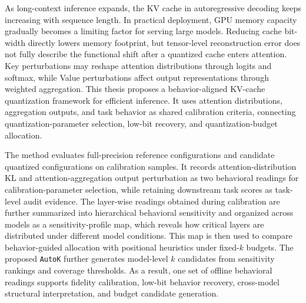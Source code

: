 
\begin{abstracten}

As long-context inference expands, the KV cache in autoregressive decoding keeps increasing with sequence length. In practical deployment, GPU memory capacity gradually becomes a limiting factor for serving large models. Reducing cache bit-width directly lowers memory footprint, but tensor-level reconstruction error does not fully describe the functional shift after a quantized cache enters attention. Key perturbations may reshape attention distributions through logits and softmax, while Value perturbations affect output representations through weighted aggregation. This thesis proposes a behavior-aligned KV-cache quantization framework for efficient inference. It uses attention distributions, aggregation outputs, and task behavior as shared calibration criteria, connecting quantization-parameter selection, low-bit recovery, and quantization-budget allocation.

The method evaluates full-precision reference configurations and candidate quantized configurations on calibration samples. It records attention-distribution KL and attention-aggregation output perturbation as two behavioral readings for calibration-parameter selection, while retaining downstream task scores as task-level audit evidence. The layer-wise readings obtained during calibration are further summarized into hierarchical behavioral sensitivity and organized across models as a sensitivity-profile map, which reveals how critical layers are distributed under different model conditions. This map is then used to compare behavior-guided allocation with positional heuristics under fixed-$k$ budgets. The proposed \texttt{AutoK} further generates model-level $k$ candidates from sensitivity rankings and coverage thresholds. As a result, one set of offline behavioral readings supports fidelity calibration, low-bit behavior recovery, cross-model structural interpretation, and budget candidate generation.


\end{abstracten}
